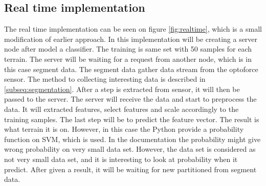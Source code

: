 \documentclass[USenglish]{ifimaster}  %
\begin{document}
\subsection{Real time implementation}
The real time implementation can be seen on figure \ref{fig:realtime}, which is a small modification of earlier approach. In this implementation will be creating a server node after model a classifier. The training is same set with 50 samples for each terrain. The server will be waiting for a request from another node, which is in this case segment data. The segment data gather data stream from the optoforce sensor. The method to collecting interesting data is described in \ref{subseq:segmentation}. After a step is extracted from sensor, it will then be passed to the server. The server will receive the data and start to preprocess the data. It will extracted features, select features and scale accordingly to the training samples. The last step will be to predict the feature vector. The result is what terrain it is on. However, in this case the Python provide a probability function on SVM, which is used. In the documentation the probability might give wrong probability on very small data set. However, the data set is considered as not very small data set, and it is interesting to look at probability when it predict. After given a result, it will be waiting for new partitioned from segment data. 
\end{document}
